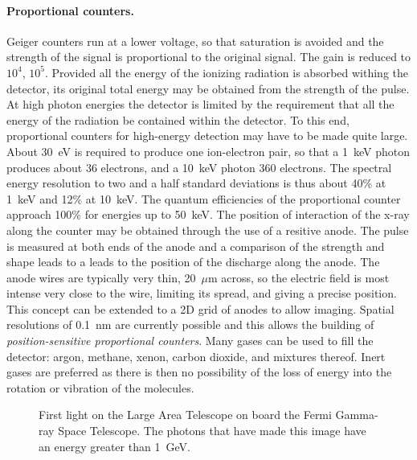 \documentclass{article}
\begin{document}
\paragraph{Proportional counters.} Geiger counters run at a lower voltage, so that 
saturation is avoided and the strength of the signal is proportional to the
original signal. The gain is reduced to $10^4$, $10^5$. Provided all the
energy of the ionizing radiation is absorbed withing the detector, its
original total energy may be obtained from the strength of the pulse. 
At high photon energies the detector is limited by the requirement that 
all the energy of the radiation be contained within the detector. To this
end, proportional counters for high-energy detection may have to be made quite
large. About 30~eV is required to produce one ion-electron pair, so that a
1~keV photon produces about 36 electrons, and a 10~keV photon 360 electrons. 
The spectral energy resolution to two and a half standard deviations is 
thus about 40\% at 1~keV and 12\% at 10~keV. The quantum efficiencies 
of the proportional counter approach 100\% for energies up to
50~keV. The position of interaction of the x-ray along the counter may
be obtained through the use of a resitive anode. The pulse is measured
at both ends of the anode and a comparison of the strength and shape
leads to a leads to the position of the discharge along the anode. The
anode wires are typically very thin, 20~$\mu$m across, so the electric
field is most intense very close to the wire, limiting its spread, and
giving a precise position. This concept can be extended to a 2D grid
of anodes to allow imaging. Spatial resolutions of 0.1~nm are
currently possible and this allows the building of {\it
  position-sensitive proportional counters}. Many
gases can be used to fill the detector: argon, methane, xenon, carbon dioxide,
and mixtures thereof. Inert gases are preferred as there is then no possibility
of the loss of energy into the rotation or vibration of the molecules. 

\begin{figure}[h]
  \centering  {}
  \caption{First light on the Large Area Telescope on board the Fermi Gamma-ray
Space Telescope. The photons that have made this image have an energy
greater than 1~GeV.}
  \label{fig:glast_allsky}
\end{figure}
\end{document}
